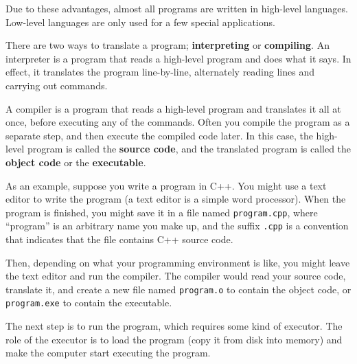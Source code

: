 Due to these advantages, almost all programs are written in
high-level languages.  Low-level languages are only used for
a few special applications.


There are two ways to translate a program; {\bf interpreting} or {\bf
compiling}.  An interpreter is a program that reads a high-level
program and does what it says.  In effect, it translates the program
line-by-line, alternately reading lines and carrying out commands.

\vspace{0.1in}
\centerline{
}%
\vspace{0.1in}

A compiler is a program that reads a high-level program and
translates it all at once, before executing any of the commands.
Often you compile the program as a separate step, and then
execute the compiled code later.  In this case, the high-level
program is called the {\bf source code}, and the translated
program is called the {\bf object code} or the {\bf executable}.

As an example, suppose you write a program in C++.  You might
use a text editor to write the program (a text editor is
a simple word processor).  When the program is finished, you
might save it in a file named {\tt program.cpp}, where ``program''
is an arbitrary name you make up, and the suffix {\tt .cpp} is
a convention that indicates that the file contains C++ source
code.

Then, depending on what your programming environment is like,
you might leave the text editor and run the compiler.  The
compiler would read your source code, translate it, and create
a new file named {\tt program.o} to contain the object code,
or {\tt program.exe} to contain the executable. 

\vspace{0.1in}
\centerline{}
\vspace{0.1in}

The next step is to run the program, which requires some kind
of executor.  The role of the executor is to load the program
(copy it from disk into memory) and make the computer start
executing the program.

